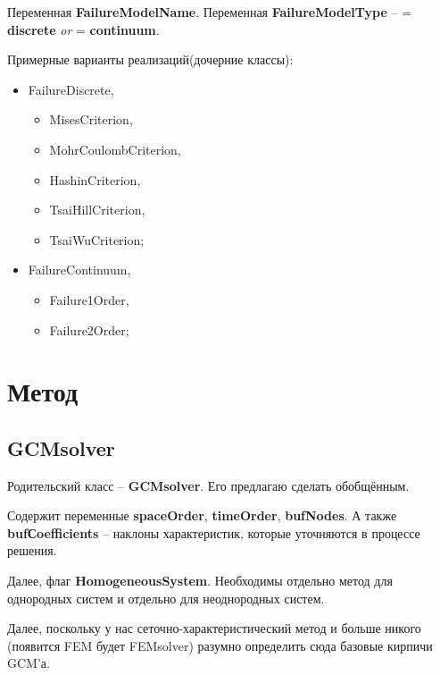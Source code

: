 \documentclass[a4paper,12pt]{article}
\numberwithin{equation}{section}
\begin{document}
	Переменная \textbf{FailureModelName}.
	Переменная \textbf{FailureModelType} -- = \textbf{discrete} \textit{or} = \textbf{continuum}.
	
	Примерные варианты реализаций(дочерние классы):
	\begin{itemize}
		\item{FailureDiscrete,}
		\begin{itemize}
			\item{MisesCriterion,}
			\item{MohrCoulombCriterion,}
			\item{HashinCriterion,}
			\item{TsaiHillCriterion,}
			\item{TsaiWuCriterion;}
		\end{itemize}
		\item{FailureContinuum,}
		\begin{itemize}
			\item{Failure1Order,}
			\item{Failure2Order;}
		\end{itemize}
	\end{itemize}
	
\section{Метод}
\subsection{GCMsolver}
	Родительский класс -- \textbf{GCMsolver}. Его предлагаю сделать обобщённым.
	
	Содержит переменные \textbf{spaceOrder}, \textbf{timeOrder}, \textbf{bufNodes}.
	А также \textbf{bufСoefficients} -- наклоны характеристик, которые уточняются в процессе решения.
	
	Далее, флаг \textbf{HomogeneousSystem}. Необходимы отдельно метод для однородных систем и отдельно для неоднородных систем.
	
	Далее, поскольку у нас сеточно-характеристический метод и больше никого (появится FEM будет FEMsolver) разумно определить сюда базовые кирпичи GCM'а.
	
\end{document}
